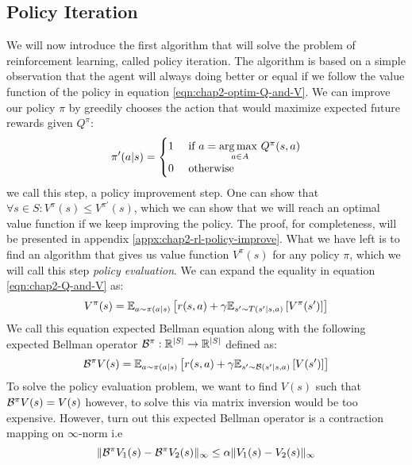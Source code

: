 \subsection{Policy Iteration}
\label{sec:chap2-policy-iter}
We will now introduce the first algorithm that will solve the problem of reinforcement learning, called policy iteration. The algorithm is based on a simple observation that the agent will always doing better or equal if we follow the value function of the policy in equation \ref{eqn:chap2-optim-Q-and-V}. We can improve our policy $\pi$ by greedily chooses the action that would maximize expected future rewards given $Q^\pi$:
\begin{equation}
    \label{eqn:chap2-greedy-Q}
    \pi'(a | s) = \begin{cases}
        1 &\text{ if } a = \underset{a \in A}{\arg\max \ } Q^\pi(s, a) \\
        0 &\text{ otherwise }
    \end{cases}
\end{equation}
we call this step, a policy improvement step. One can show that $\forall s \in S: V^\pi(s) \le V^{\pi'}(s)$, which we can show that we will reach an optimal value function if we keep improving the policy. The proof, for completeness, will be presented in appendix \ref{appx:chap2-rl-policy-improve}. What we have left is to find an algorithm that gives us value function $V^{\pi}(s)$ for any policy $\pi$, which we will call this step \textit{policy evaluation}. We can expand the equality in equation \ref{eqn:chap2-Q-and-V} as:
\begin{equation}
    V^\pi(s) = \mathbb{E}_{a \sim \pi(a | s)} \left[ r(s, a) + \gamma \mathbb{E}_{s' \sim T(s' | s, a)}\left[ V^\pi(s') \right] \right] 
\end{equation}
We call this equation expected Bellman equation along with the following expected Bellman operator $\mathcal{B}^{\pi} : \mathbb{R}^{|S|} \rightarrow \mathbb{R}^{|S|}$ defined as:
\begin{equation}
    \label{eqn:chap2-exp-bellman-operator}
    \mathcal{B}^{\pi} V(s) = \mathbb{E}_{a \sim \pi(a | s)} \left[ r(s, a) + \gamma \mathbb{E}_{s' \sim \mathcal{B}(s' | s, a)}\left[ V(s') \right] \right] 
\end{equation}
To solve the policy evaluation problem, we want to find $V(s)$ such that $\mathcal{B}^\pi V(s) = V(s)$ however, to solve this via matrix inversion would be too expensive. However, turn out this expected Bellman operator is a contraction mapping on $\infty$-norm i.e 
\begin{equation*}
    \| \mathcal{B}^\pi V_1(s) - \mathcal{B}^\pi V_2(s) \|_\infty \le \alpha \|V_1(s) - V_2(s)\|_\infty
\end{equation*}
